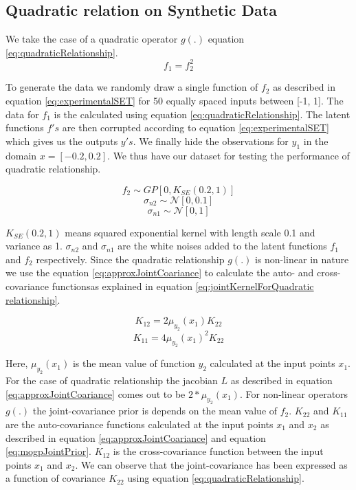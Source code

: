 \subsection{Quadratic relation on Synthetic Data}\label{sub:experimentsSyntheticData}
We take the case of a quadratic operator \(g(.)\) equation \ref{eq:quadraticRelationship}. 
\begin{equation}\label{eq:quadraticRelationship}
f_{1} = f_{2}^2
\end{equation}

To generate the data we randomly draw a single function of \(f_{2}\) as described in equation \ref{eq:experimentalSET} for 50 equally spaced inputs between [-1, 1]. The data for \(f_{1}\) is the calculated using equation \ref{eq:quadraticRelationship}. The latent functions \(f's\) are then corrupted according to equation \ref{eq:experimentalSET} which gives us the outputs \(y's\). We finally hide the observations for \(y_{1}\) in the domain \(x = [-0.2, 0.2]\). We thus have our dataset for testing the performance of quadratic relationship. 

\begin{equation*}
f_{2} \sim  GP[0, K_{SE}(0.2, 1)]
\end{equation*}
\begin{equation*}
\sigma_{n2} \sim \mathcal{N}[0, 0.1]
\end{equation*}
\begin{equation}\label{eq:experimentalSET}
\sigma_{n1} \sim \mathcal{N}[0, 1]
\end{equation}
     
\(K_{SE}(0.2, 1)\) means squared exponential kernel with length scale 0.1 and variance as 1. \(\sigma_{n2}\) and \(\sigma_{n1}\) are the white noises added to the latent functions \(f_{1}\) and \(f_{2}\) respectively. Since the quadratic relationship \(g(.)\) is non-linear in nature we use the equation \ref{eq:approxJointCoariance} to calculate the auto- and cross-covariance functionsas explained in equation \ref{eq:jointKernelForQuadratic relationship}. 

\begin{equation*}
K_{12} = 2\mu_{y_{2}}(x_{1})K_{22}
\end{equation*}
\begin{equation}\label{eq:jointKernelForQuadratic relationship}
K_{11} = 4\mu_{y_{2}}(x_{1})^2K_{22}
\end{equation}

Here, \(\mu_{y_{2}}(x_{1})\) is the mean value of function \(y_{2}\) calculated at the input points \(x_{1}\). For the case of quadratic relationship the jacobian \(L\) as described in equation \ref{eq:approxJointCoariance} comes out to be \(2*\mu_{y_{2}}(x_{1})\). For non-linear operators \(g(.)\) the joint-covariance prior is depends on the mean value of \(f_{2}\). \(K_{22}\) and \(K_{11}\) are the auto-covariance functions calculated at the input points \(x_{1}\) and \(x_{2}\) as described in equation \ref{eq:approxJointCoariance} and equation \ref{eq:mogpJointPrior}. \(K_{12}\) is the cross-covariance function between the input points \(x_{1}\) and \(x_{2}\). We can observe that the joint-covariance has been expressed as a function of covariance \(K_{22}\) using equation \ref{eq:quadraticRelationship}.  


